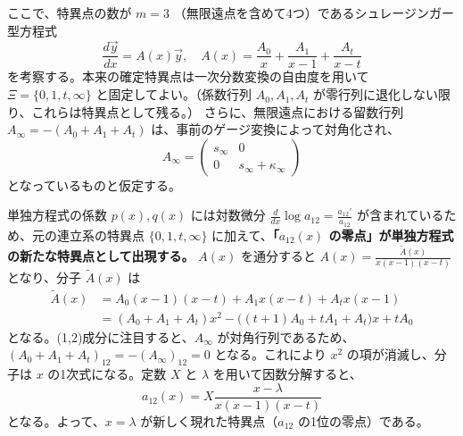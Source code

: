 ここで、特異点の数が $m=3$ （無限遠点を含めて4つ）であるシュレージンガー型方程式
\begin{equation}\label{eq:schlesinger_m3}
\frac{d\vec{y}}{dx} = A(x)\vec{y}, \quad A(x) = \frac{A_{0}}{x} + \frac{A_{1}}{x-1} + \frac{A_{t}}{x-t}
\end{equation}
を考察する。本来の確定特異点は一次分数変換の自由度を用いて $\Xi=\{0, 1, t, \infty\}$ と固定してよい。（係数行列 $A_0, A_1, A_t$ が零行列に退化しない限り、これらは特異点として残る。）
さらに、無限遠点における留数行列 $A_{\infty} = -(A_{0} + A_{1} + A_{t})$ は、事前のゲージ変換によって対角化され、
\[
A_{\infty} =
\begin{pmatrix}
s_{\infty} & 0\\
0 & s_{\infty}+\kappa_{\infty}
\end{pmatrix}
\]
となっているものと仮定する。

単独方程式の係数 $p(x), q(x)$ には対数微分 $\frac{d}{dx}\log a_{12} = \frac{a_{12}'}{a_{12}}$ が含まれているため、元の連立系の特異点 $\{0, 1, t, \infty\}$ に加えて、\textbf{「$a_{12}(x)$ の零点」が単独方程式の新たな特異点として出現する。}
$A(x)$ を通分すると $A(x) = \frac{\tilde{A}(x)}{x(x-1)(x-t)}$ となり、分子 $\tilde{A}(x)$ は
\begin{align*}
\tilde{A}(x) &= A_{0}(x-1)(x-t) + A_{1}x(x-t) + A_{t}x(x-1)\\
&= (A_{0}+A_{1}+A_{t})x^{2} - \big((t+1)A_{0}+tA_{1}+A_{t}\big)x + tA_{0}
\end{align*}
となる。(1,2)成分に注目すると、$A_{\infty}$ が対角行列であるため、$(A_{0}+A_{1}+A_{t})_{12} = -(A_{\infty})_{12} = 0$ となる。これにより $x^{2}$ の項が消滅し、分子は $x$ の1次式になる。定数 $X$ と $\lambda$ を用いて因数分解すると、
\[
a_{12}(x) = X\frac{x-\lambda}{x(x-1)(x-t)}
\]
となる。よって、$x=\lambda$ が新しく現れた特異点（$a_{12}$ の1位の零点）である。

